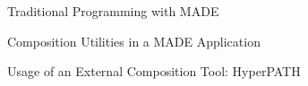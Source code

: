 {\samepage \clearpage \begin{figure}%
[tbp]
  \leavevmode\centering
  \epsfysize=5in
  \caption{Traditional Programming with MADE}
  \label{fig:traditional}
\end{figure}
}


\newpage

{\samepage \clearpage \begin{figure}%
[tbp]
  \leavevmode\centering
  \epsfysize=4.8in
  \caption{Composition Utilities in a MADE Application}
  \label{fig:compo}
\end{figure}
}


\newpage

{\samepage \clearpage \begin{figure}%
[tbp]
  \leavevmode\centering
  \epsfysize=4.8in
  \caption{Usage of an External Composition Tool: HyperPATH}
  \label{fig:hyperp}
\end{figure}
}



